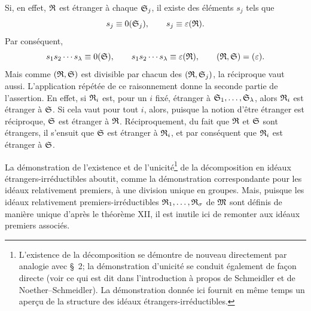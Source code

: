 Si, en effet, $\mathfrak{R}$ est étranger à chaque $\mathfrak{S}_j$, il existe des éléments $s_j$ tels que
\[
 s_j\equiv0(\mathfrak{S}_j),
 \qquad
 s_j\equiv\varepsilon(\mathfrak{R}).
\]
Par conséquent,
\[
 s_1s_2\cdots s_\lambda\equiv0(\mathfrak{S}),
 \qquad
 s_1s_2\cdots s_\lambda\equiv\varepsilon(\mathfrak{R}),
 \qquad
 (\mathfrak{R},\mathfrak{S})=(\varepsilon).
\]
Mais comme $(\mathfrak{R},\mathfrak{S})$ est divisible par chacun des $(\mathfrak{R},\mathfrak{S}_j)$, la réciproque vaut aussi. L'application répétée de ce raisonnement donne la seconde partie de l'assertion. En effet, si $\mathfrak{R}_i$ est, pour un $i$ fixé, étranger à $\mathfrak{S}_1,\ldots,\mathfrak{S}_\lambda$, alors $\mathfrak{R}_i$ est étranger à $\mathfrak{S}$. Si cela vaut pour tout $i$, alors, puisque la notion d'être étranger est réciproque, $\mathfrak{S}$ est étranger à $\mathfrak{R}$. Réciproquement, du fait que $\mathfrak{R}$ et $\mathfrak{S}$ sont étrangers, il s'ensuit que $\mathfrak{S}$ est étranger à $\mathfrak{R}_i$, et par conséquent que $\mathfrak{R}_i$ est étranger à $\mathfrak{S}$.

La démonstration de l'existence et de l'unicité\footnote{L'existence de la décomposition se démontre de nouveau directement par analogie avec \S~2; la démonstration d'unicité se conduit également de façon directe (voir ce qui est dit dans l'introduction à propos de Schmeidler et de Noether--Schmeidler). La démonstration donnée ici fournit en même temps un aperçu de la structure des idéaux étrangers-irréductibles.} de la décomposition en idéaux étrangers-irréductibles aboutit, comme la démonstration correspondante pour les idéaux relativement premiers, à une division unique en groupes. Mais, puisque les idéaux relativement premiers-irréductibles $\mathfrak{R}_1,\ldots,\mathfrak{R}_\sigma$ de $\mathfrak{M}$ sont définis de manière unique d'après le théorème XII, il est inutile ici de remonter aux idéaux premiers associés.


